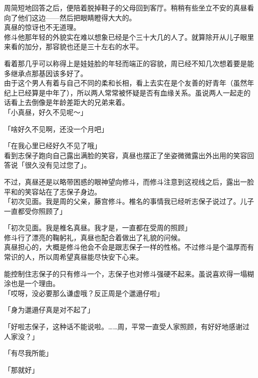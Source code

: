 周简短地回答之后，便陪着脱掉鞋子的父母回到客厅。稍稍有些坐立不安的真昼看向了他们这边——然后把眼睛瞪得大大的。\\

真昼的惊讶也不无道理。\\

修斗他那年轻的外貌实在难以想象已经是个三十大几的人了。就算除开从儿子眼里来看的加分，那容貌也还是三十左右的水平。

看着那几乎可以称得上是娃娃脸的年轻而端正的容貌，周已经不知几次想着要是能多继承点那基因该多好了。\\

由于这个男人有着与自己不同的柔和长相，看上去实在是个友善的好青年（虽然年纪上已经算是中年了），所以两人常常被怀疑是否有血缘关系。虽说两人一起走的话看上去倒像是年龄差距大的兄弟来着。\\

「小真昼，好久不见呢～」

「啥好久不见啊，还没一个月吧」

「在我心里已经好久不见了哦」\\

看到志保子跑向自己露出满脸的笑容，真昼也摆正了坐姿微微露出外出用的笑容回答说「很久没有见过您了」。

不过，真昼还是以略带困惑的眼神望向修斗，而修斗注意到这视线之后，露出一脸平和的笑容站在了志保子身边。\\

「初次见面。我是周的父亲，藤宫修斗。椎名的事情我已经听志保子说过了。儿子一直都受你照顾了」

「初次见面。我是椎名真昼。我才是，一直都在受周的照顾」\\

修斗行了漂亮的鞠躬礼，真昼也配合着做出了礼貌的问候。\\

真昼担心的，大概是修斗他会不会是跟志保子一样的性格。不过修斗是个温厚而有常识的人，所以周希望真昼能尽快安下心来。

能控制住志保子的只有修斗一个，志保子也对修斗强硬不起来。虽说喜欢得一塌糊涂也是一个理由。\\

「哎呀，没必要那么谦虚哦？反正周是个邋遢仔啦」

「身为邋遢仔真是对不起了」

「好啦志保子，这种话不能说啦。……周，平常一直受人家照顾，有好好地感谢过人家没？」

「有尽我所能」

「那就好」\\

